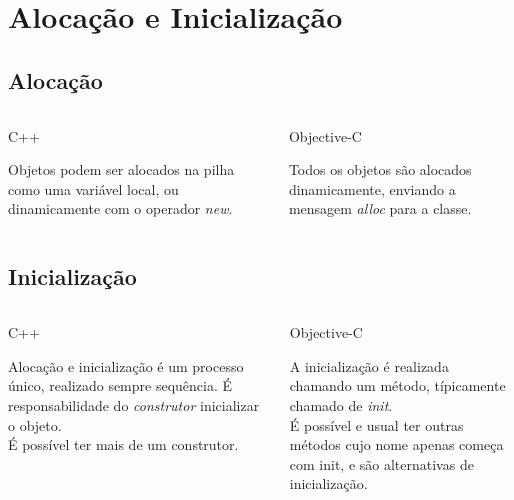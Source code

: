 \documentclass[brazil]{beamer}
\begin{document}
\section{Alocação e Inicialização}

\subsection{Alocação}
\begin{frame}
  \begin{columns}
    \begin{column}{.5\textwidth}
        \begin{center}
            C++
        \end{center}
        Objetos podem ser alocados na pilha como uma variável local, ou dinamicamente com o operador \textit{new}.
    \end{column}
    \begin{column}{.5\textwidth}
        \begin{center}
            Objective-C
        \end{center}
        Todos os objetos são alocados dinamicamente, enviando a mensagem \textit{alloc} para a classe.
    \end{column}
  \end{columns}
\end{frame}

\subsection{Inicialização}
\begin{frame}
  \begin{columns}
    \begin{column}{.5\textwidth}
        \begin{center}
            C++
        \end{center}
        Alocação e inicialização é um processo único, realizado sempre sequência. 
        É responsabilidade do \textit{construtor} inicializar o objeto. \\
        É possível ter mais de um construtor.
    \end{column}
    \begin{column}{.5\textwidth}
        \begin{center}
            Objective-C
        \end{center}
        A inicialização é realizada chamando um método, típicamente chamado de \textit{init}. \\
        É possível e usual ter outras métodos cujo nome apenas começa com init, e são alternativas de inicialização.
    \end{column}
  \end{columns}
\end{frame}
\end{document}
